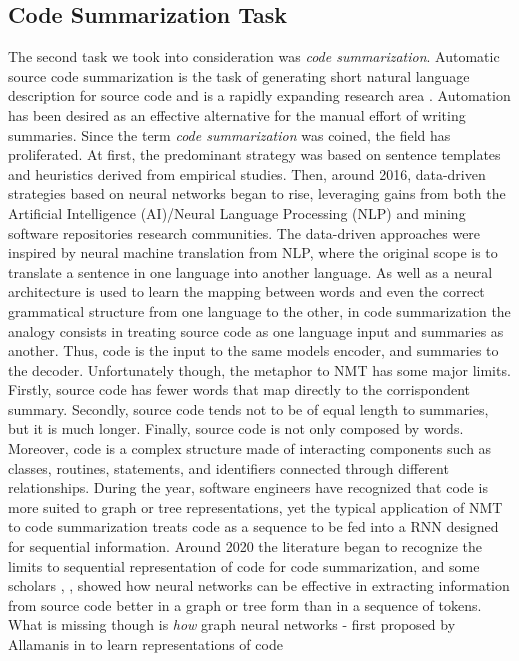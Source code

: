 \subsection{Code Summarization Task}
The second task we took into consideration was \textit{code summarization}. Automatic source code summarization is the task of generating short natural language description 
for source code and is a rapidly expanding research area \cite{Leclair2020}. 
Automation has been desired as an effective alternative for the manual effort of writing summaries. 
Since the term \textit{code summarization} was coined, the field has proliferated. At first, the predominant strategy was based on sentence templates 
and heuristics derived from empirical studies. Then, around 2016, data-driven strategies based on neural networks began to rise, leveraging 
gains from both the Artificial Intelligence (AI)/Neural Language Processing (NLP) and mining 
software repositories research communities. 
The data-driven approaches were inspired by neural machine translation from NLP, where the original scope is to translate a sentence in 
one language into another language.
As well as a neural architecture is used to learn the mapping between words and even the correct grammatical structure from one language to the other, 
in code summarization the analogy consists in treating source code as one language input and summaries as another. Thus, code is the input to the same 
models encoder, and summaries to the decoder. 
Unfortunately though, the metaphor to NMT has some major limits. 
Firstly, source code has fewer words that map directly to 
the corrispondent summary. Secondly, source code tends not to be of equal length to summaries, but it is much longer.
Finally, source code is not only composed by words. Moreover, code is a complex structure made of interacting components such as
classes, routines, statements, and identifiers connected through different relationships.
During the year, software engineers have recognized that code is more suited to graph or tree representations, yet the typical application of 
NMT to code summarization treats code as a sequence to be fed into a RNN designed for sequential information.
Around 2020 the literature began to recognize the limits to sequential representation of code 
for code summarization, and some scholars \cite{hu2018deep}, \cite{leclair2019neural}, \cite{alon2018code2seq} showed how neural networks can be effective in extracting information from source code 
better in a graph or tree form than in a sequence of tokens. 
What is missing though is \textit{how} graph neural networks - first proposed by Allamanis in \cite{allamanis2018learning} to learn representations of code 
